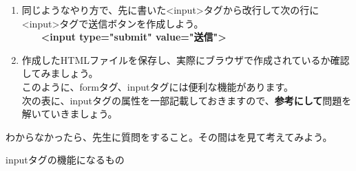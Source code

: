 \begin{enumerate}
  \item
    同じようなやり方で、先に書いた{\textless}input{\textgreater}タグから改行して次の行に{\textless}input{\textgreater}タグで送信ボタンを作成しよう。\\
    \ \ \ \ \textbf{{\textless}input type="submit" value="送信"{\textgreater}}

  \item
    作成したHTMLファイルを保存し、実際にブラウザで作成されているか確認してみましょう。\\
    このように、formタグ、inputタグには便利な機能があります。\\
    次の表に、inputタグの属性を一部記載しておきますので、\textbf{参考にして}問題を解いていきましょう。
\end{enumerate}

\clearpage

\begin{tcolorbox}[title=\useOmetoi,breakable]\label{Q:HTML}
  \begin{enumerate}
  \end{enumerate}
\end{tcolorbox}

\clearpage



わからなかったら、先生に質問をすること。その間はを見て考えてみよう。

inputタグの機能になるもの

